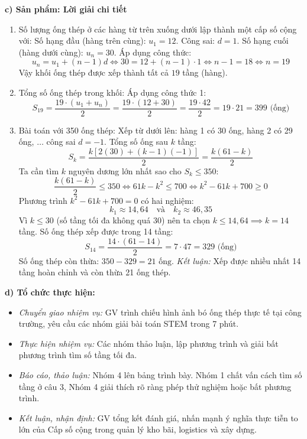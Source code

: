 \documentclass[12pt, a4paper]{article}
\begin{document}
\noindent \textbf{c) Sản phẩm: Lời giải chi tiết}  
\begin{enumerate}[leftmargin=0.6cm]  
    \item Số lượng ống thép ở các hàng từ trên xuống dưới lập thành một cấp số cộng với:  
    Số hạng đầu (hàng trên cùng): $u_1 = 12$.  
    Công sai: $d = 1$.  
    Số hạng cuối (hàng dưới cùng): $u_n = 30$.  
    Áp dụng công thức:  
    $$u_n = u_1 + (n - 1)d \iff 30 = 12 + (n - 1) \cdot 1 \iff n - 1 = 18 \iff n = 19$$  
    Vậy khối ống thép được xếp thành tất cả $19$ tầng (hàng).  
    \item Tổng số ống thép trong khối:  
    Áp dụng công thức 1:  
    $$S_{19} = \dfrac{19 \cdot (u_1 + u_n)}{2} = \dfrac{19 \cdot (12 + 30)}{2} = \dfrac{19 \cdot 42}{2} = 19 \cdot 21 = 399\text{ (ống)}$$  
    \item Bài toán với 350 ống thép:  
    Xếp từ dưới lên: hàng 1 có 30 ống, hàng 2 có 29 ống, $\dots$ công sai $d = -1$.  
    Tổng số ống sau $k$ tầng:  
    $$S_k = \dfrac{k[2(30) + (k - 1)(-1)]}{2} = \dfrac{k(61 - k)}{2}$$  
    Ta cần tìm $k$ nguyên dương lớn nhất sao cho $S_k \le 350$:  
    $$\dfrac{k(61 - k)}{2} \le 350 \iff 61k - k^2 \le 700 \iff k^2 - 61k + 700 \ge 0$$  
    Phương trình $k^2 - 61k + 700 = 0$ có hai nghiệm:  
    $$k_1 \approx 14{,}64 \quad \text{và} \quad k_2 \approx 46{,}35$$  
    Vì $k \le 30$ (số tầng tối đa không quá 30) nên ta chọn $k \le 14{,}64 \implies k = 14$ tầng.  
    Số ống thép xếp được trong 14 tầng:  
    $$S_{14} = \dfrac{14 \cdot (61 - 14)}{2} = 7 \cdot 47 = 329\text{ (ống)}$$  
    Số ống thép còn thừa: $350 - 329 = 21\text{ ống}$.  
    \textit{Kết luận:} Xếp được nhiều nhất 14 tầng hoàn chỉnh và còn thừa 21 ống thép.  
\end{enumerate}  
  
\noindent \textbf{d) Tổ chức thực hiện:}  
\begin{itemize}[leftmargin=0.8cm]  
    \item \textit{Chuyển giao nhiệm vụ:} GV trình chiếu hình ảnh bó ống thép thực tế tại công trường, yêu cầu các nhóm giải bài toán STEM trong 7 phút.  
    \item \textit{Thực hiện nhiệm vụ:} Các nhóm thảo luận, lập phương trình và giải bất phương trình tìm số tầng tối đa.  
    \item \textit{Báo cáo, thảo luận:} Nhóm 4 lên bảng trình bày. Nhóm 1 chất vấn cách tìm số tầng ở câu 3, Nhóm 4 giải thích rõ ràng phép thử nghiệm hoặc bất phương trình.  
    \item \textit{Kết luận, nhận định:} GV tổng kết đánh giá, nhấn mạnh ý nghĩa thực tiễn to lớn của Cấp số cộng trong quản lý kho bãi, logistics và xây dựng.  
\end{itemize}  
  
\end{document}
